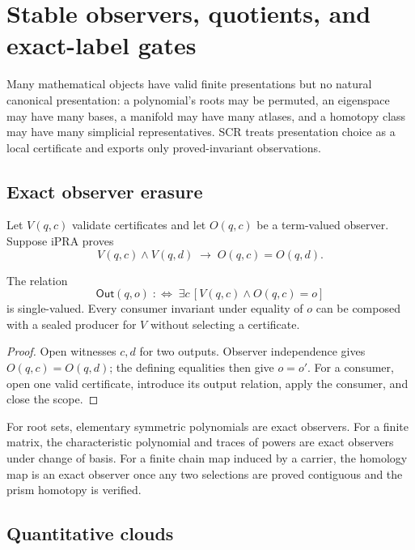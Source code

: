 \section{Stable observers, quotients, and exact-label gates}
\label{sec:observer}

Many mathematical objects have valid finite presentations but no natural
canonical presentation: a polynomial's roots may be permuted, an eigenspace
may have many bases, a manifold may have many atlases, and a homotopy class may
have many simplicial representatives.  SCR treats presentation choice as a
local certificate and exports only proved-invariant observations.

\subsection{Exact observer erasure}

Let \(V(q,c)\) validate certificates and let \(O(q,c)\) be a term-valued
observer.  Suppose iPRA proves
\[
 V(q,c)\wedge V(q,d)\;\longrightarrow\;O(q,c)=O(q,d).
\]

\begin{theorem}
\label{thm:observer-exact}
The relation
\[
  \mathsf{Out}(q,o)\;:\!\Longleftrightarrow\;
  \exists c\,[V(q,c)\wedge O(q,c)=o]
\]
is single-valued.  Every consumer invariant under equality of \(o\) can be
composed with a sealed producer for \(V\) without selecting a certificate.
\end{theorem}

\begin{proof}
Open witnesses \(c,d\) for two outputs.  Observer independence gives
\(O(q,c)=O(q,d)\); the defining equalities then give \(o=o'\).  For a consumer,
open one valid certificate, introduce its output relation, apply the consumer,
and close the scope.
\end{proof}

For root sets, elementary symmetric polynomials are exact observers.  For a
finite matrix, the characteristic polynomial and traces of powers are exact
observers under change of basis.  For a finite chain map induced by a carrier,
the homology map is an exact observer once any two selections are proved
contiguous and the prism homotopy is verified.

\subsection{Quantitative clouds}

